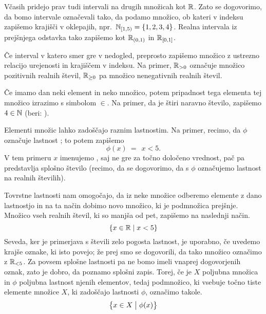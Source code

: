 		Včasih pridejo prav tudi intervali na drugih množicah kot $\mathbb{R}$. Zato se dogovorimo, da bomo intervale označevali tako, da podamo množico, ob kateri v indeksu zapišemo krajišči v oklepajih, npr.~$\intco[\NN]{1}{5} = \set{1, 2, 3, 4}$. Realna intervala iz prejšnjega odstavka tako zapišemo kot ${\mathbb{R}}_{(0, 1)}$ in ${\mathbb{R}}_{[0, 1]}$.
		
		Če interval v katero smer gre v nedogled, preprosto zapišemo množico z ustrezno relacijo urejenosti in krajiščem v indeksu. Na primer, $\mathbb{R}_{> 0}$ označuje množico pozitivnih realnih števil, $\mathbb{R}_{\geq 0}$ pa množico nenegativnih realnih števil.
		
		
		Če imamo dan neki element in neko množico, potem pripadnost tega elementa tej množico izrazimo s simbolom $\in$. Na primer, da je štiri naravno število, zapišemo $4 \in \mathbb{N}$ (beri: ).
		
		Elementi množic lahko zadoščajo raznim lastnostim. Na primer, recimo, da $\phi$ označuje lastnost ; to potem zapišemo
		\[\phi(x) \ = \ \ x < 5.\]
		V tem primeru $x$ imenujemo , saj ne gre za točno določeno vrednost, pač pa predstavlja splošno število (recimo, da se dogovorimo, da s $\phi$ označujemo lastnost na realnih številih).
		
		Tovrstne lastnosti nam omogočajo, da iz neke množice odberemo elemente z dano lastnostjo in na ta način dobimo novo množico, ki je podmnožica prejšnje. Množico vseh realnih števil, ki so manjša od pet, zapišemo na naslednji način.
		\[\set{x \in \RR}{x < 5}\]
		Seveda, ker je primerjava s števili zelo pogosta lastnost, je uporabno, če uvedemo krajše oznake, ki isto povejo; že prej smo se dogovorili, da tako množico označimo z $\mathbb{R}_{< 5}$. Za povsem splošne lastnosti pa ne bomo imeli vnaprej dogovorjenih oznak, zato je dobro, da poznamo splošni zapis. Torej, če je $X$ poljubna množica in $\phi$ poljubna lastnost njenih elementov, tedaj podmnožico, ki vsebuje točno tiste elemente množice $X$, ki zadoščajo lastnosti $\phi$, označimo takole.
		\[\set[1]{x \in X}{\phi(x)}\]
		
